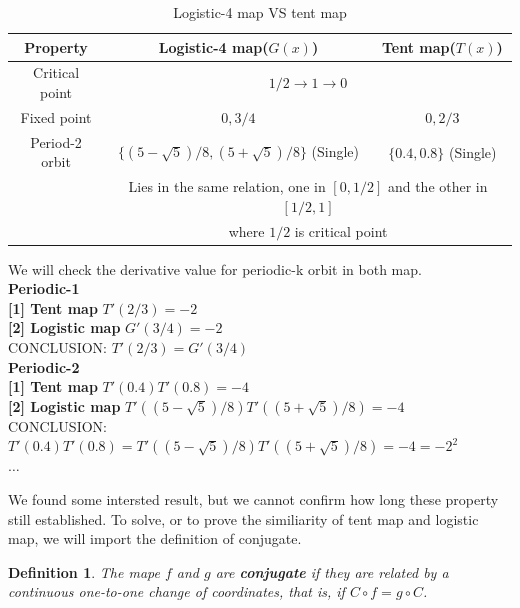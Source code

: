 \documentclass[12pt]{article}
\theoremstyle{plain}
\newtheorem{definition}{{\color{red}\textbf{Definition}}}[section]
\begin{document}
\begin{table}[H]
\centering  
\caption{Logistic-4 map VS tent map}  
\begin{tabular}{|c||c|c|}
\hline
Property             & Logistic-4 map($G(x)$)  & Tent map($T(x)$) \\
\hline
\hline
Critical point       & \multicolumn{2}{c|}{$1/2 \rightarrow 1 \rightarrow 0$}\\
\hline
Fixed point          & $0, 3/4$ & $0, 2/3$ \\
\hline
Period-2 orbit       & $\{(5-\sqrt5)/8, (5+\sqrt5)/8\}$ (Single) & $\{0.4, 0.8\}$ (Single) \\
                     & \multicolumn{2}{c|}{Lies in the same relation, one in $[0, 1/2]$ and the other in $[1/2, 1]$} \\
                     & \multicolumn{2}{c|}{where $1/2$ is critical point} \\
\hline
\end{tabular}  
\end{table}  

We will check the derivative value for periodic-k orbit in both map.
\\\noindent \textbf{Periodic-1}
\\\noindent \textbf{[1] Tent map} $T'(2/3) = -2$
\\\noindent \textbf{[2] Logistic map} $G'(3/4) = -2$
\\\noindent CONCLUSION: $T'(2/3) = G'(3/4)$
\\\noindent \textbf{Periodic-2}
\\\noindent \textbf{[1] Tent map} $T'(0.4)T'(0.8) = -4$
\\\noindent \textbf{[2] Logistic map} $T'((5-\sqrt5)/8)T'((5+\sqrt5)/8) = -4$
\\\noindent CONCLUSION: $T'(0.4)T'(0.8) = T'((5-\sqrt5)/8)T'((5+\sqrt5)/8) = -4 = -2^2$
\\\noindent $\ldots$

We found some intersted result, but we cannot confirm how long these property still established. To solve, or to prove the similiarity of tent map and logistic map, we will import the definition of conjugate.

\begin{definition}The mape $f$ and $g$ are \textbf{conjugate} if they are related by a continuous one-to-one change of coordinates, that is, if $C \circ f = g \circ C$.
\end{definition}
\end{document}
